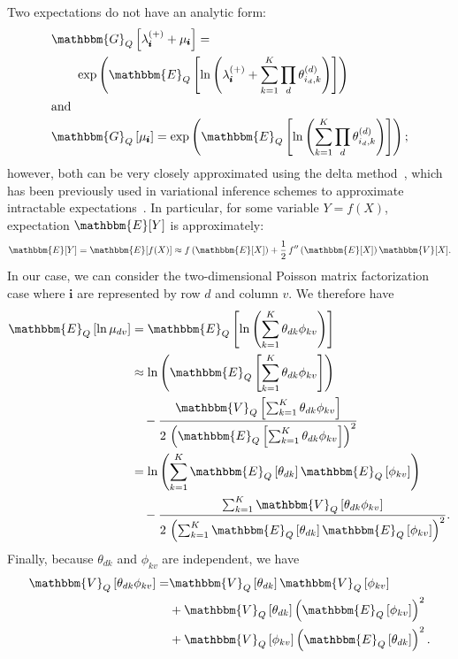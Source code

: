 \documentclass{article}
\newcommand{\subs}{\pmb{i}}
\newcommand{\wsup}[2]{#1_{\subs}^{(#2)}}
\newcommand{\lamP}{\wsup{\lambda}{+}}
\newcommand{\Eq}[1]{\mathbbm{E}_Q\left[#1\right]}
\newcommand{\Vq}[1]{\mathbbm{V}_Q\left[#1\right]}
\newcommand{\Gq}[1]{\mathbbm{G}_Q\left[#1\right]}
\begin{document}
  Two expectations do not have an analytic form:
  \begin{align}
  &\Gq{\lamP + \mu_{\subs}} = \notag \\
    &\quad\quad \exp\left(\Eq{\ln \left(\lamP
    + \sum_{k=1}^K \prod_d \theta_{i_d,k}^{(d)} \right)}\right) \\
  \intertext{and}
  &\Gq{\mu_{\subs}} = \exp\left(\Eq{\ln \left(\sum_{k=1}^K \prod_d \theta_{i_d,k}^{(d)} \right)}\right);
  \end{align}
  however, both can be very closely approximated using the delta
  method~\citep{ver2012invented}, which has been previously used in variational
  inference schemes to approximate intractable
  expectations~\citep{braun2010variational,wang2013variational}. In particular,
  for some variable $Y = f(X)$, expectation $\mathbbm{E}[Y]$ is approximately:
  \begin{equation}
  \mathbbm{E}[Y] = \mathbbm{E}[f(X)] \approx f\left(\mathbbm{E}[X]\right) + \frac{1}{2} \, f''\left(\mathbbm{E}[X]\right) \mathbbm{V}[X].
  \end{equation}
  In our case, we can consider the two-dimensional Poisson matrix factorization
  case where $\subs$ are represented by row $d$ and column $v$. We therefore
  have
  \begin{align}
  \Eq{\ln \mu_{dv}} &= \Eq{\ln\left(\sum_{k=1}^K \theta_{dk}\phi_{kv}\right)} \notag \\
  &\approx \ln\left(\Eq{\sum_{k=1}^K \theta_{dk}\phi_{kv}}\right) \notag \\
  &\quad - \frac{\mathbbm{V}_{Q}\left[\sum_{k=1}^K \theta_{dk} \phi_{kv}\right]}{2 \, \left(\Eq{\sum_{k=1}^K \theta_{dk} \phi_{kv}}\right)^2} \notag \\
  &=\ln\left(\sum_{k=1}^K \Eq{\theta_{dk}}\Eq{\phi_{kv}}\right) \notag \\
  &\quad - \frac{\sum_{k=1}^K \Vq{\theta_{dk} \phi_{kv}}}{2 \, \left(\sum_{k=1}^K \Eq{\theta_{dk}} \Eq{\phi_{kv}}\right)^2}.
  \end{align}
  Finally, because $\theta_{dk}$ and $\phi_{kv}$ are independent, we have
  \begin{align}
  \Vq{\theta_{dk} \phi_{kv}} =& \Vq{\theta_{dk}} \Vq{\phi_{kv}} \notag \\
  &+ \Vq{\theta_{dk}} \left(\Eq{\phi_{kv}}\right)^2 \notag \\
  &+ \Vq{\phi_{kv}} \left(\Eq{\theta_{dk}}\right)^2.
  \end{align}
\end{document}
